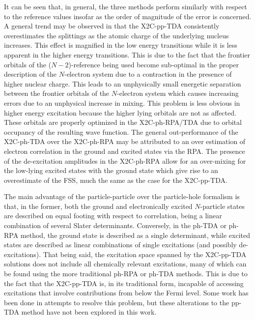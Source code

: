 It can be seen that, in general, the three methods perform similarly with
respect to the reference values insofar as the order of magnitude of the error
is concerned. A general trend may be observed in that the X2C-pp-TDA
consistently overestimates the splittings as the atomic charge of the
underlying nucleus increases. This effect is magnified in the low energy
transitions while it is less apparent in the higher energy transitions. This is
due to the fact that the frontier orbitals of the ($N-2$)-reference being used
become sub-optimal in the proper description of the $N$-electron system due to
a contraction in the presence of higher nuclear charge. This leads to an
unphysically small energetic separation between the frontier orbitals of the
$N$-electron system which causes increasing errors due to an unphysical
increase in mixing. This problem is less obvious in higher energy excitation
because the higher lying orbitals are not as affected. These orbitals are
properly optimized in the X2C-ph-RPA/TDA due to orbital occupancy of the
resulting wave function. The general out-performance of the X2C-ph-TDA over the
X2C-ph-RPA may be attributed to an over estimation of electron correlation in
the ground and excited states via the RPA\cite{Dreuw05_4009}. The presence of
the de-excitation amplitudes in the X2C-ph-RPA allow for an over-mixing for the
low-lying excited states with the ground state which give rise to an
overestimate of the FSS, much the same as the case for the X2C-pp-TDA.
                                                                                                                                                 
 
                                                                                                                                                                                                                                                              
 
The main advantage of the particle-particle over the particle-hole formalism is
that, in the former, both the ground and electronically excited $N$-particle
states are described on equal footing with respect to correlation, being a
linear combination of several Slater determinants.  Conversely, in the ph-TDA
or ph-RPA method, the ground state is described as a single determinant, while
excited states are described as linear combinations of single excitations (and
possibly de-excitations).  That being said, the excitation space spanned by the
X2C-pp-TDA solutions does not include all chemically relevant excitations, many
of which can be found using the more traditional ph-RPA or ph-TDA methods.
This is due to the fact that the X2C-pp-TDA is, in its traditional form,
incapable of accessing excitations that involve contributions from below the
Fermi level.  Some work has been done in attempts to resolve this
problem\cite{Yang13_224105}, but these alterations to the pp-TDA method have
not been explored in this work.

